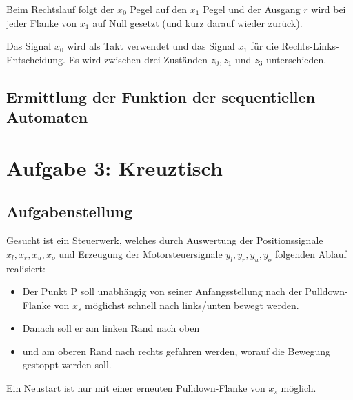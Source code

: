\documentclass[a4paper,12pt,titlepage]{scrartcl}
\begin{document}
Beim Rechtslauf folgt der $x_0$ Pegel auf den $x_1$ Pegel und der Ausgang $r$ wird bei jeder Flanke von $x_1$ auf Null gesetzt (und kurz darauf wieder zurück).

Das Signal $x_0$ wird als Takt verwendet und das Signal $x_1$ für die Rechts-Links-Entscheidung.
Es wird zwischen drei Zuständen $z_0,z_1$ und $z_3$ unterschieden.

\subsection*{Ermittlung der Funktion der sequentiellen Automaten}
\begin{center}
\end{center}
\newpage

\section*{Aufgabe 3: Kreuztisch}
\subsection*{Aufgabenstellung}
Gesucht ist ein Steuerwerk, welches durch Auswertung der Positionssignale $x_l,x_r,x_u,x_o$ und Erzeugung der Motorsteuersignale $y_l,y_r,y_u,y_o$ folgenden Ablauf realisiert:
\begin{itemize}
    \item Der Punkt P soll unabhängig von seiner Anfangsstellung nach der Pulldown-Flanke von $x_s$ möglichst schnell nach links/unten bewegt werden.
    \item Danach soll er am linken Rand nach oben
    \item und am oberen Rand nach rechts gefahren werden, worauf die Bewegung gestoppt werden soll.
\end{itemize}
Ein Neustart ist nur mit einer erneuten Pulldown-Flanke von $x_s$ möglich.
\end{document}
